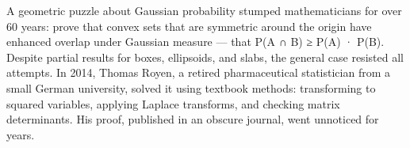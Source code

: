 A geometric puzzle about Gaussian probability stumped mathematicians for over 60 years: prove that convex sets that are symmetric around the origin have enhanced overlap under Gaussian measure — that P(A ∩ B) ≥ P(A) · P(B). Despite partial results for boxes, ellipsoids, and slabs, the general case resisted all attempts. In 2014, Thomas Royen, a retired pharmaceutical statistician from a small German university, solved it using textbook methods: transforming to squared variables, applying Laplace transforms, and checking matrix determinants. His proof, published in an obscure journal, went unnoticed for years. 
